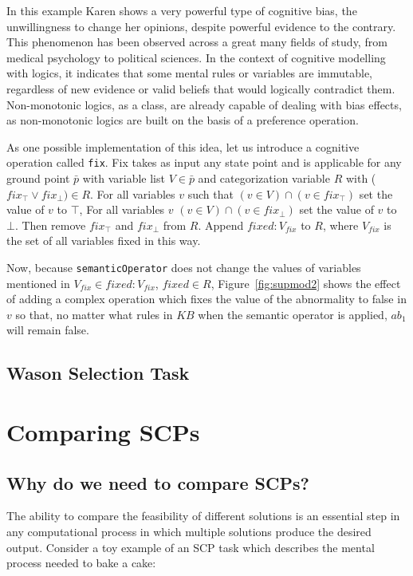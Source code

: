 \documentclass[
11pt, %
english, %
singlespacing, %
headsepline, %
]{MastersDoctoralThesis} %
\begin{document}
In this example Karen shows a very powerful type of cognitive bias, the unwillingness to change her opinions, despite powerful evidence to the contrary. This phenomenon has been observed across a great many fields of study, from medical psychology \citep{brown2010omission} \citep{wroe2005feeling} to political sciences\citep{tappin2017heart}. In the context of cognitive modelling with logics, it indicates that some mental rules or variables are immutable, regardless of new evidence or valid beliefs that would logically contradict them. Non-monotonic logics, as a class, are already capable of dealing with bias effects, as non-monotonic logics are built on the basis of a preference operation.

 As one possible implementation of this idea, let us introduce a cognitive operation called \texttt{fix}. Fix takes as input any state point and is applicable for any ground point $\bar{p}$ with variable list $V \in \bar{p}$ and categorization variable $R$ with ($fix_\top \lor fix_\bot) \in R$. For all variables $v$ such that $(v \in V) \cap (v \in fix_\top)$ set the value of $v$ to $\top$, For all variables $v$ $(v \in V) \cap (v \in fix_\bot)$ set the value of $v$ to $\bot$. Then remove $fix_\top$ and $fix_\bot$ from $R$. Append $fixed:V_{fix}$ to $R$, where $V_{fix}$ is the set of all variables fixed in this way.

Now, because \texttt{semanticOperator} does not change the values of variables mentioned in $V_{fix} \in fixed:V_{fix}$, $fixed \in R$, Figure~\ref{fig:supmod2} shows the effect of adding a complex operation which fixes the value of the abnormality to false in $v$ so that, no matter what rules in $KB$ when the semantic operator is applied, $ab_1$ will remain false.
\section{Wason Selection Task}

\chapter{Comparing SCPs}
\section{Why do we need to compare SCPs?} \label{sec:whyCompare}
The ability to compare the feasibility of different solutions is an essential step in any computational process in which multiple solutions produce the desired output. Consider a toy example of an SCP task which describes the mental process needed to bake a cake:
\end{document}
